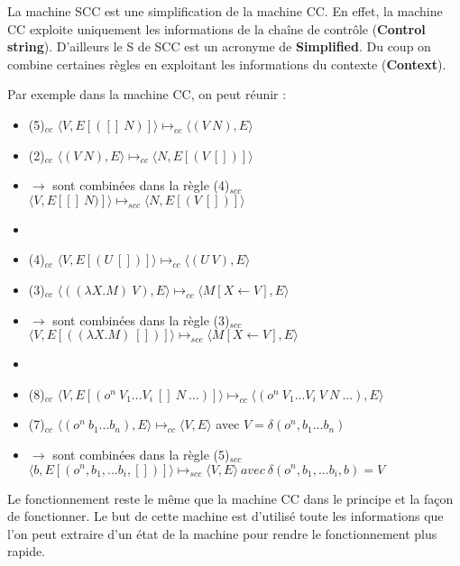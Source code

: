 \documentclass[10pt,a4paper]{article}
\begin{document}
				La machine SCC est une simplification de la machine CC. En effet, la machine CC exploite uniquement les informations de la chaîne de contrôle (\textbf{Control string}). D'ailleurs le S de SCC est un acronyme de \textbf{Simplified}. Du coup on combine certaines règles en exploitant les informations du contexte (\textbf{Context}).
				\bigbreak
				
				
				Par exemple dans la machine CC, on peut réunir :
				
				\begin{itemize}
					\item[] (5)$_{cc}$ $\langle V,E[([]~N)]\rangle \longmapsto_{cc} \langle(V~N),E\rangle$
					\item[] (2)$_{cc}$ $\langle(V~N),E\rangle \longmapsto_{cc}  \langle N,E[(V~[])]\rangle$
					\item[] $\rightarrow$ sont combinées dans la règle (4)$_{scc}$ $ \langle V,E[[]~N)]\rangle \longmapsto_{scc} \langle N,E[(V~[])]\rangle$
					\item[]
					\item[] (4)$_{cc}$ $\langle V,E[(U~[])]\rangle \longmapsto_{cc} \langle(U~V),E\rangle$
					\item[]	(3)$_{cc}$ $\langle((\lambda X.M)~V),E\rangle \longmapsto_{cc} \langle M[X\longleftarrow V],E\rangle$
					\item[] $\rightarrow$ sont combinées dans la règle (3)$_{scc}$ $\langle V,E[((\lambda X.M)~[])]\rangle \longmapsto_{scc} \langle M[X\leftarrow V],E\rangle$
					\item[]
					\item[] (8)$_{cc}$ $\langle V,E[(o^{n}~V_{1}...V_{i}~[]~N~...)]\rangle \longmapsto_{cc} \langle(o^{n}~V_{1}...V_{i}~V~N ~...),E\rangle$ 
					\item[] (7)$_{cc}$ $\langle(o^{n}~b_{1}...b_{n}),E\rangle \longmapsto_{cc}  \langle V,E\rangle$ avec $V = \delta(o^{n},b_{1}...b_{n})$ 
					\item[] $\rightarrow$ sont combinées dans la règle (5)$_{scc}$ $\langle b,E[(o^{n},b_{1},...b_{i},[])]\rangle \longmapsto_{scc} \langle V,E\rangle~avec~\delta
					(o^{n},b_{1},...b_{i},b)=V$
				\end{itemize}
				\medbreak
				
				Le fonctionnement reste le même que la machine CC dans le principe et la façon de fonctionner. Le but de cette machine est d'utilisé toute les informations que l'on peut extraire d'un état de la machine pour rendre le fonctionnement plus rapide.
				\bigbreak
				
\end{document}
